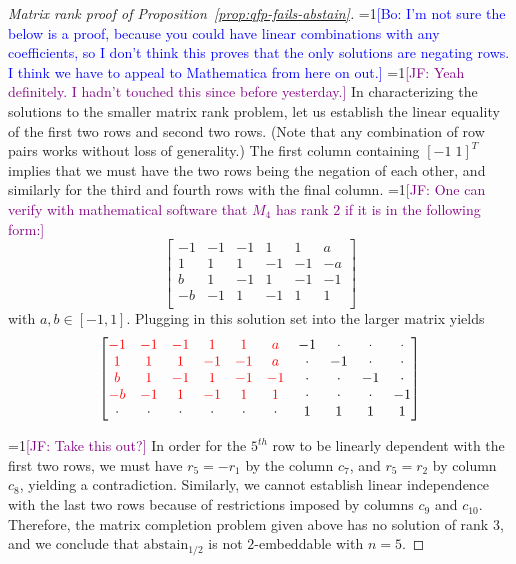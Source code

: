 \documentclass[anon]{colt2020} %
\newcommand{\Comments}{1}
\newcommand{\mynote}[2]{\ifnum\Comments=1\textcolor{#1}{#2}\fi}
\newcommand{\jessie}[1]{\mynote{purple}{[JF: #1]}}
\newcommand{\bo}[1]{\mynote{blue}{[Bo: #1]}}
\newcommand{\abstain}[1]{\mathrm{abstain}_{#1}}
\begin{document}
\begin{proof}[Matrix rank proof of Proposition~\ref{prop:qfp-fails-abstain}]
	\bo{I'm not sure the below is a proof, because you could have linear combinations with any coefficients, so I don't think this proves that the only solutions are negating rows. I think we have to appeal to Mathematica from here on out.}
	\jessie{Yeah definitely.  I hadn't touched this since before yesterday.}
	In characterizing the solutions to the smaller matrix rank problem, let us establish the linear equality of the first two rows and second two rows.
	(Note that any combination of row pairs works without loss of generality.)
	The first column containing $[-1 \; 1]^T$ implies that we must have the two rows being the negation of each other, and similarly for the third and fourth rows with the final column.
	\jessie{One can verify with mathematical software that $M_4$ has rank $2$ if it is in the following form:}
	\[
	\begin{bmatrix}
	-1 & -1 & -1 & 1 & 1 & a \\
	1 & 1 & 1 & -1 & -1 & -a \\
	b & 1 & -1 & 1 & -1 & -1 \\
	-b & -1 & 1 & -1 & 1 & 1 \\
	\end{bmatrix}
	\] with $a, b \in [-1,1]$.
	Plugging in this solution set into the larger matrix yields
	\[
	\begin{bmatrix}
	{\color{red} -1} & {\color{red} -1} & {\color{red} -1} & {\color{red} 1} & {\color{red} 1} & {\color{red} a} & -1 & \cdot & \cdot & \cdot \\
	{\color{red} 1} & {\color{red} 1} & {\color{red} 1} & {\color{red} -1} & {\color{red} -1} & {\color{red} a} & \cdot & -1 & \cdot & \cdot \\
	{\color{red} b} & {\color{red} 1} & {\color{red} -1} & {\color{red} 1} & {\color{red} -1} & {\color{red} -1} & \cdot & \cdot & -1 & \cdot \\
	{\color{red} -b} & {\color{red} -1} & {\color{red} 1} & {\color{red} -1} & {\color{red} 1} & {\color{red} 1} & \cdot & \cdot & \cdot & -1 \\
	\cdot & \cdot & \cdot & \cdot & \cdot & \cdot & 1 & 1 & 1 & 1\\
	\end{bmatrix}
	\]
	
	\jessie{Take this out?}
	In order for the $5^{th}$ row to be linearly dependent with the first two rows, we must have $r_5 = -r_1$ by the column $c_7$, and $r_5 = r_2$ by column $c_8$, yielding a contradiction.
	Similarly, we cannot establish linear independence with the last two rows because of restrictions imposed by columns $c_9$ and $c_{10}$.
	Therefore, the matrix completion problem given above has no solution of rank 3, and we conclude that $\abstain{1/2}$ is not $2$-embeddable with $n=5$.
\end{proof}



\end{document}
